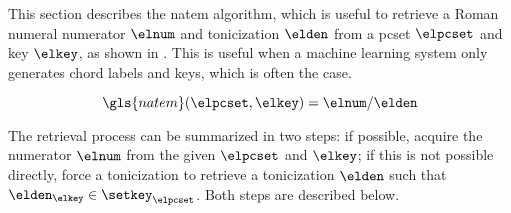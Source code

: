 
This section describes the \gls{natem} algorithm, which is
useful to retrieve a Roman numeral numerator $\elnum$ and
tonicization $\elden$ from a \gls{pcset} $\elpcset$ and key
$\elkey$, as shown in . This is useful when a
machine learning system only generates chord labels and
keys, which is often the case. 

\begin{equation}
    \label{eq:natem}
    \gls{natem}(\elpcset, \elkey) = \elnum\text{/}\elden
\end{equation}

The retrieval process can be summarized in two steps: if
possible, acquire the numerator $\elnum$ from the given
$\elpcset$ and $\elkey$; if this is not possible directly,
force a tonicization to retrieve a tonicization $\elden$
such that $\elden_\elkey \in \setkey_\elpcset$. Both steps
are described below.

